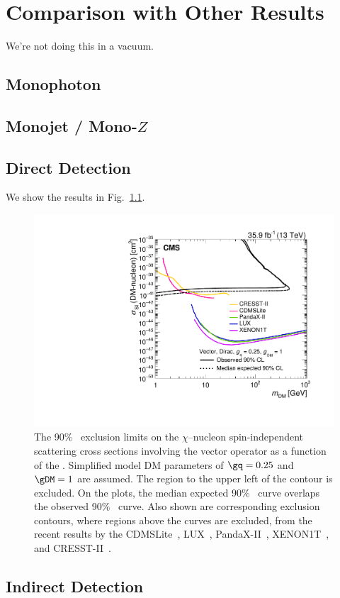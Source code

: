\chapter{Comparison with Other Results}

We're not doing this in a vacuum.

\section{Monophoton}

\section{Monojet / Mono-$Z$}

\section{Direct Detection}

We show the results in Fig.~\ref{fig:limits_direct}.

\begin{figure}[htbp]
  \centering
    \includegraphics[width=0.48\linewidth]{Impact/Figures/limits_direct.pdf}
    \caption{
      The 90\% \CL\ exclusion limits on the $\chi$--nucleon spin-independent scattering cross sections involving the vector operator as a function of the \mdm.
      Simplified model DM parameters of $\gq=0.25$ and $\gDM=1$ are assumed.
      The region to the upper left of the contour is excluded. 
      On the plots, the median expected 90\% \CL\ curve overlaps the observed 90\% \CL\ curve.
      Also shown are corresponding exclusion contours, where regions above the curves are excluded, from the recent results by the CDMSLite~\cite{Agnese:2015nto}, LUX~\cite{Akerib:2016vxi}, PandaX-II~\cite{Cui:2017}, XENON1T~\cite{Aprile:2018}, and CRESST-II~\cite{Angloher:2015ewa}.
    }
    \label{fig:limits_direct}
\end{figure}

\section{Indirect Detection}

